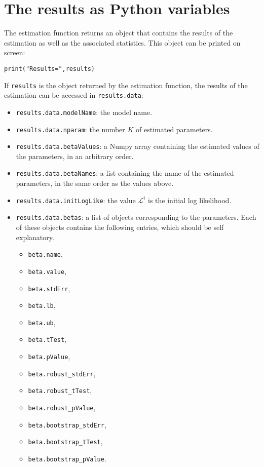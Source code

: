 \documentclass[12pt,a4paper]{article}
\begin{document}
\section{The results as Python variables}

The estimation function returns an object that contains the results of
the estimation as well as the associated statistics. This object can
be printed on screen:
\begin{lstlisting}[style=nonumbers]
print("Results=",results)
\end{lstlisting}

If \lstinline+results+ is the object returned by the estimation
function, the results of the estimation can be accessed in
\lstinline+results.data+:
\begin{itemize}
\item \lstinline+results.data.modelName+: the model name.
\item \lstinline+results.data.nparam+: the number $K$ of estimated parameters.
\item \lstinline+results.data.betaValues+: a Numpy array containing
  the estimated values of the parameters, in an arbitrary order.
\item \lstinline+results.data.betaNames+: a list containing the name
  of the estimated parameters, in the same order as the values above.
\item \lstinline+results.data.initLogLike+: the value $\mathcal{L}^i$
  is the initial log likelihood. 
\item \lstinline+results.data.betas+: a list of objects corresponding
  to the parameters. Each of these objects contains the following
  entries, which should be self explanatory. 
\begin{itemize}
\item \lstinline+beta.name+,
\item \lstinline+beta.value+,
\item \lstinline+beta.stdErr+,
\item \lstinline+beta.lb+,
\item \lstinline+beta.ub+,
\item \lstinline+beta.tTest+,
\item \lstinline+beta.pValue+,
\item \lstinline+beta.robust_stdErr+,
\item \lstinline+beta.robust_tTest+,
\item \lstinline+beta.robust_pValue+,
\item \lstinline+beta.bootstrap_stdErr+,
\item \lstinline+beta.bootstrap_tTest+,
\item \lstinline+beta.bootstrap_pValue+.
\end{itemize}
  

\end{itemize}
\end{document}
